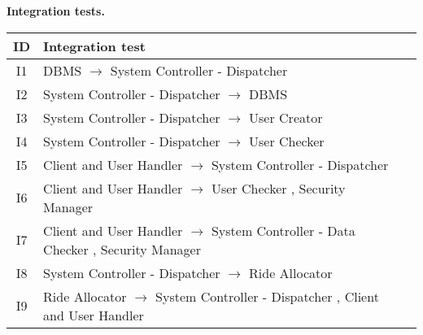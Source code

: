 \documentclass[\mainpath/main]{subfiles}
\begin{document}
\textbf{Integration tests.}\\
\begin{table}[h]
	\centering
	\begin{tabular}[!ht]{c|p{12cm}c}
		ID & Integration test & \\ \hline
		I1 &  \centering DBMS $\rightarrow$ System Controller - Dispatcher  & \\ \hline
		I2 & \centering System Controller - Dispatcher $\rightarrow$ DBMS  & \\ \hline
		I3 & \centering System Controller - Dispatcher $\rightarrow$ User Creator   & \\ \hline
		I4 & \centering System Controller - Dispatcher $\rightarrow$ User Checker   & \\ \hline
		I5 & \centering Client and User Handler $\rightarrow$ System Controller - Dispatcher   & \\ \hline
		I6 & \centering Client and User Handler $\rightarrow$ User Checker , Security Manager   & \\ \hline
		I7 & \centering Client and User Handler $\rightarrow$ System Controller - Data Checker , Security Manager   & \\ \hline
		I8 & \centering System Controller - Dispatcher $\rightarrow$ Ride Allocator   & \\ \hline
		I9 & \centering Ride Allocator $\rightarrow$ System Controller - Dispatcher , Client and User Handler   & \\ \hline
	\end{tabular}
\end{table}
\end{document}
